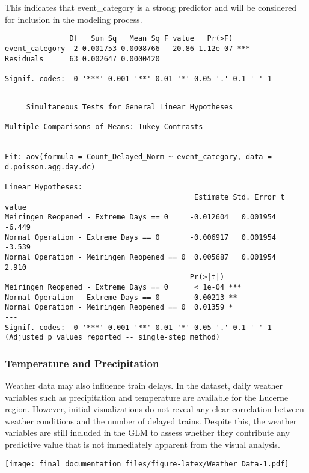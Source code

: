 \documentclass[
]{article}
\begin{document}
This indicates that event\_category is a strong predictor and will be
considered for inclusion in the modeling process.

\begin{verbatim}
               Df   Sum Sq   Mean Sq F value   Pr(>F)    
event_category  2 0.001753 0.0008766   20.86 1.12e-07 ***
Residuals      63 0.002647 0.0000420                     
---
Signif. codes:  0 '***' 0.001 '**' 0.01 '*' 0.05 '.' 0.1 ' ' 1
\end{verbatim}

\begin{verbatim}

     Simultaneous Tests for General Linear Hypotheses

Multiple Comparisons of Means: Tukey Contrasts


Fit: aov(formula = Count_Delayed_Norm ~ event_category, data = d.poisson.agg.day.dc)

Linear Hypotheses:
                                            Estimate Std. Error t value
Meiringen Reopened - Extreme Days == 0     -0.012604   0.001954  -6.449
Normal Operation - Extreme Days == 0       -0.006917   0.001954  -3.539
Normal Operation - Meiringen Reopened == 0  0.005687   0.001954   2.910
                                           Pr(>|t|)    
Meiringen Reopened - Extreme Days == 0      < 1e-04 ***
Normal Operation - Extreme Days == 0        0.00213 ** 
Normal Operation - Meiringen Reopened == 0  0.01359 *  
---
Signif. codes:  0 '***' 0.001 '**' 0.01 '*' 0.05 '.' 0.1 ' ' 1
(Adjusted p values reported -- single-step method)
\end{verbatim}

\subsubsection{Temperature and
Precipitation}\label{temperature-and-precipitation}

Weather data may also influence train delays. In the dataset, daily
weather variables such as precipitation and temperature are available
for the Lucerne region. However, initial visualizations do not reveal
any clear correlation between weather conditions and the number of
delayed trains. Despite this, the weather variables are still included
in the GLM to assess whether they contribute any predictive value that
is not immediately apparent from the visual analysis.

\texttt{[image: final\_documentation\_files/figure-latex/Weather Data-1.pdf]}
\end{document}
